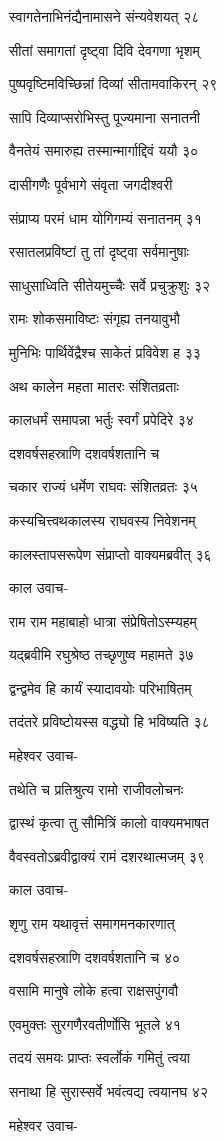 स्वागतेनाभिनंद्यैनामासने संन्यवेशयत् २८

सीतां समागतां दृष्ट्वा दिवि देवगणा भृशम्

पुष्पवृष्टिमविच्छिन्नां दिव्यां सीतामवाकिरन् २९

सापि दिव्याप्सरोभिस्तु पूज्यमाना सनातनी

वैनतेयं समारुह्य तस्मान्मार्गाद्दिवं ययौ ३०

दासीगणैः पूर्वभागे संवृता जगदीश्वरी

संप्राप्य परमं धाम योगिगम्यं सनातनम् ३१

रसातलप्रविष्टां तु तां दृष्ट्वा सर्वमानुषाः

साधुसाध्विति सीतेयमुच्चैः सर्वे प्रचुक्रुशुः ३२

रामः शोकसमाविष्टः संगृह्य तनयावुभौ

मुनिभिः पार्थिवेंद्रैश्च साकेतं प्रविवेश ह ३३

अथ कालेन महता मातरः संशितव्रताः

कालधर्मं समापन्ना भर्तुः स्वर्गं प्रपेदिरे ३४

दशवर्षसहस्राणि दशवर्षशतानि च

चकार राज्यं धर्मेण राघवः संशितव्रतः ३५

कस्यचित्त्वथकालस्य राघवस्य निवेशनम्

कालस्तापसरूपेण संप्राप्तो वाक्यमब्रवीत् ३६

काल उवाच-

राम राम महाबाहो धात्रा संप्रेषितोऽस्म्यहम्

यद्ब्रवीमि रघुश्रेष्ठ तच्छृणुष्व महामते ३७

द्वन्द्वमेव हि कार्यं स्यादावयोः परिभाषितम्

तदंतरे प्रविष्टोयस्स वद्ध्यो हि भविष्यति ३८

महेश्वर उवाच-

तथेति च प्रतिश्रुत्य रामो राजीवलोचनः

द्वास्थं कृत्वा तु सौमित्रिं कालो वाक्यमभाषत

वैवस्वतोऽब्रवीद्वाक्यं रामं दशरथात्मजम् ३९

काल उवाच-

शृणु राम यथावृत्तं समागमनकारणात्

दशवर्षसहस्राणि दशवर्षशतानि च ४०

वसामि मानुषे लोके हत्वा राक्षसपुंगवौ

एवमुक्तः सुरगणैरवतीर्णोसि भूतले ४१

तदयं समयः प्राप्तः स्वर्लोकं गमितुं त्वया

सनाथा हि सुरास्सर्वे भवंत्वद्य त्वयानघ ४२

महेश्वर उवाच-

